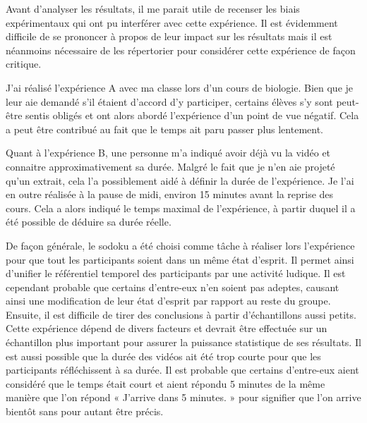 \documentclass[12pt,fleqn,oneside,openany,]{book} %
\begin{document}
Avant d'analyser les résultats, il me parait utile de recenser les biais expérimentaux qui ont pu interférer avec cette expérience. Il est évidemment difficile de se prononcer à propos de leur impact sur les résultats mais il est néanmoins nécessaire de les répertorier pour considérer cette expérience de façon critique.

J'ai réalisé l'expérience A avec ma classe lors d'un cours de biologie. Bien que je leur aie demandé s'il étaient d'accord d'y participer, certains élèves s'y sont peut-être sentis obligés et ont alors abordé l'expérience d'un point de vue négatif. Cela a peut être contribué au fait que le temps ait paru passer plus lentement.

Quant à l'expérience B, une personne m'a indiqué avoir déjà vu la vidéo et connaitre approximativement sa durée. Malgré le fait que je n'en aie projeté qu'un extrait, cela l'a possiblement aidé à définir la durée de l'expérience.
Je l'ai en outre réalisée à la pause de midi, environ 15 minutes avant la reprise des cours. Cela a alors indiqué le temps maximal de l'expérience, à partir duquel il a été possible de déduire sa durée réelle.

De façon générale, le sodoku a été choisi comme tâche à réaliser lors l'expérience pour que tout les participants soient dans un même état d'esprit. Il permet ainsi d'unifier le référentiel temporel des participants par une activité ludique. Il est cependant probable que certains d'entre-eux n'en soient pas adeptes, causant ainsi une modification de leur état d'esprit par rapport au reste du groupe.
Ensuite, il est difficile de tirer des conclusions à partir d'échantillons aussi petits. Cette expérience dépend de divers facteurs et devrait être effectuée sur un échantillon plus important pour assurer la puissance statistique de ses résultats.
Il est aussi possible que la durée des vidéos ait été trop courte pour que les participants réfléchissent à sa durée. Il est probable que certains d'entre-eux aient considéré que le temps était court et aient répondu 5 minutes de la même manière que l'on répond « J'arrive dans 5 minutes. » pour signifier que l'on arrive bientôt sans pour autant être précis. 


\end{document}
